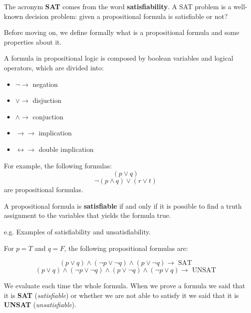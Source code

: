 The acronym \textbf{SAT} comes from the word \textbf{satisfiability}. A SAT problem is a well-known decision problem: given a propositional formula is 
satisfiable or not? \vspace{7pt}

Before moving on, we define formally what is a propositional formula and some properties about it.
\begin{definition}
    A formula in propositional logic is composed by boolean variables and logical operators, which are divided into:
    \begin{itemize}
        \renewcommand{\labelitemi}{-}
        \item $\neg \rightarrow$ negation
        \item $\vee \rightarrow$ disjuction
        \item $\wedge \rightarrow$ conjuction
        \item $\rightarrow \rightarrow$ implication
        \item $\leftrightarrow \rightarrow$ double implication
    \end{itemize} 
    For example, the following formulas:
    $$ (p \vee q) $$
    $$ \neg (p \wedge q) \vee (r \vee t) $$
    are propositional formulas.
\end{definition}
\begin{definition}
    A propositional formula is \textbf{satisfiable} if and only if it is possible to find a truth assignment to the variables that yields the formula true.
\end{definition}
\begin{example}
    e.g. Examples of satisfiability and unsatisfiability. \vspace{7pt}

    For $p = T$ and $q = F$, the following propositional formulas are:

    $$ (p \vee q) \wedge (\neg p \vee \neg q) \wedge (p \vee \neg q) \rightarrow \text{ SAT} $$ 
    $$ (p \vee q) \wedge (\neg p \vee \neg q) \wedge (p \vee \neg q) \wedge (\neg p \vee q) \rightarrow \text{ UNSAT} $$

    We evaluate each time the whole formula. When we prove a formula we said that it is \textbf{SAT} (\textit{satisfiable}) or whether we are not able to 
    satisfy it we said that it is \textbf{UNSAT} (\textit{unsatisfiable}).
\end{example}